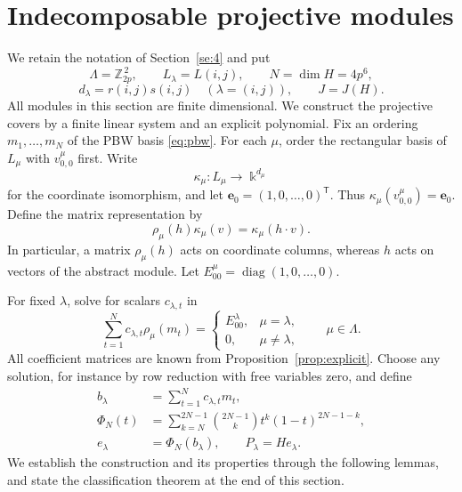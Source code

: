 \documentclass[10pt,oneside]{amsart}
\newcommand{\kk}{\Bbbk}
\theoremstyle{definition}
\begin{document}
\section{Indecomposable projective modules}\label{sec:projectives}
We retain the notation of Section~\ref{se:4} and put
\[
 \Lambda=\mathbb Z_{2p}^{\,2},\qquad L_\lambda=L(i,j),\qquad N=\dim H=4p^6,
\]
\[
 d_\lambda=r(i,j)s(i,j)\quad(\lambda=(i,j)),\qquad J=J(H).
\]
All modules in this section are finite dimensional. We construct the
projective covers by a finite linear system and an explicit polynomial.
 Fix an ordering $m_1,\ldots,m_N$ of the PBW basis
\eqref{eq:pbw}. For each $\mu$, order the rectangular basis of $L_\mu$
with $v_{0,0}^\mu$ first. Write
\[
 \kappa_\mu:L_\mu\longrightarrow\kk^{d_\mu}
\]
for the coordinate isomorphism, and let $\mathbf e_0=(1,0,\ldots,0)^{\mathsf T}$.
Thus $\kappa_\mu(v_{0,0}^\mu)=\mathbf e_0$. Define the matrix representation by
\[
 \rho_\mu(h)\kappa_\mu(v)=\kappa_\mu(h\cdot v).
\]
In particular, a matrix $\rho_\mu(h)$ acts on coordinate columns, whereas
$h$ acts on vectors of the abstract module. Let
$E_{00}^\mu=\operatorname{diag}(1,0,\ldots,0)$.

For fixed $\lambda$, solve for scalars $c_{\lambda,t}$ in
\begin{equation}\label{eq:projective-system}
 \sum_{t=1}^{N}c_{\lambda,t}\rho_\mu(m_t)
 =\begin{cases}E_{00}^\lambda,&\mu=\lambda,\\0,&\mu\ne\lambda,
 \end{cases}\qquad\mu\in\Lambda.
\end{equation}
All coefficient matrices are known from Proposition~\ref{prop:explicit}.
Choose any solution, for instance by row reduction with free variables
zero, and define
\begin{align}
 b_\lambda&=\sum_{t=1}^{N}c_{\lambda,t}m_t,\label{eq:projective-lift}\\
 \Phi_N(t)&=\sum_{k=N}^{2N-1}\binom{2N-1}{k}
                         t^k(1-t)^{2N-1-k},\label{eq:idempotent-polynomial}\\
 e_\lambda&=\Phi_N(b_\lambda),\qquad P_\lambda=He_\lambda.
 \label{eq:projective-definition}
\end{align}
We establish the construction and its properties through the following lemmas, and state the classification theorem at the end of this section.
\end{document}
